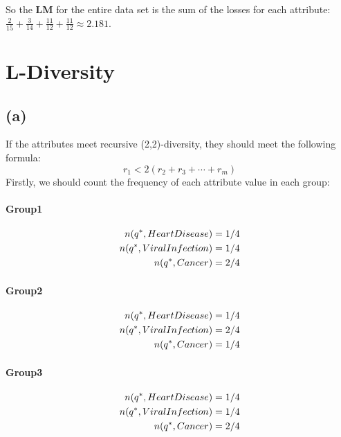 \documentclass[a4paper,12pt]{article}
\begin{document}
So the \textbf{LM} for the entire data set is the sum of the losses for each attribute: $\frac{2}{15} + \frac{3}{14} + \frac{11}{12} + \frac{11}{12} \approx 2.181$.

\section{L-Diversity}
\subsection{(a)}
If the attributes meet recursive (2,2)-diversity, they should meet the following formula:
\begin{equation}
    r_1 < 2(r_2+r_3+\cdots+r_m)
\end{equation}
Firstly, we should count the frequency of each attribute value in each group:

\paragraph*{Group1}
\begin{equation}
    \begin{aligned}
        n(q^*, Heart\space Disease)   & = 1/4 \\
        n(q^*, Viral\space Infection) & = 1/4 \\
        n(q^*, Cancer)                & = 2/4 \\
    \end{aligned}
\end{equation}

\paragraph*{Group2}
\begin{equation}
    \begin{aligned}
        n(q^*, Heart\space Disease)   & = 1/4 \\
        n(q^*, Viral\space Infection) & = 2/4 \\
        n(q^*, Cancer)                & = 1/4 \\
    \end{aligned}
\end{equation}

\paragraph*{Group3}
\begin{equation}
    \begin{aligned}
        n(q^*, Heart\space Disease)   & = 1/4 \\
        n(q^*, Viral\space Infection) & = 1/4 \\
        n(q^*, Cancer)                & = 2/4 \\
    \end{aligned}
\end{equation}
\end{document}
